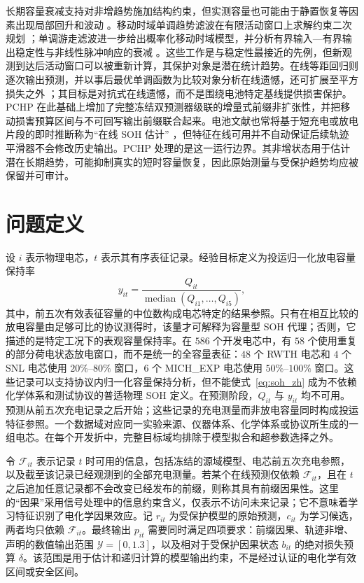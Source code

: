 \documentclass[UTF8,11pt]{ctexart}
\begin{document}
长期容量衰减支持对非增趋势施加结构约束，但实测容量也可能由于静置恢复等因素出现局部回升和波动 \citep{ma2021regeneration}。移动时域单调趋势滤波在有限活动窗口上求解约束二次规划 \mbox{\citep{samar2004moving}}；单调游走滤波进一步给出概率化移动时域模型，并分析有界输入—有界输出稳定性与非线性脉冲响应的衰减 \citep{gorinevsky2008efficient}。这些工作是与稳定性最接近的先例，但新观测到达后活动窗口可以被重新计算，其保护对象是潜在统计趋势。在线等距回归则逐次输出预测，并以事后最优单调函数为比较对象分析在线遗憾，还可扩展至平方损失之外 \citep{kotlowski2016online}；其目标是对抗式在线遗憾，而不是围绕电池特定基线提供损害保护。PCHP 在此基础上增加了完整冻结双预测器级联的增量式前缀非扩张性，并把移动损害预算区间与不可回写输出前缀联合起来。电池文献也常将基于短充电或放电片段的即时推断称为“在线 SOH 估计” \citep{liu2020online}，但特征在线可用并不自动保证后续轨迹平滑器不会修改历史输出。PCHP 处理的是这一运行边界。其非增状态用于估计潜在长期趋势，可能抑制真实的短时容量恢复，因此原始测量与受保护趋势均应被保留并可审计。

\section{问题定义}

设 $i$ 表示物理电芯，$t$ 表示其有序表征记录。经验目标定义为投运归一化放电容量保持率
\begin{equation}
  y_{it}=\frac{Q_{it}}{\operatorname{median}(Q_{i1},\ldots,Q_{i5})},
  \label{eq:soh_zh}
\end{equation}
其中，前五次有效表征容量的中位数构成电芯特定的结果参照。只有在相互比较的放电容量由足够可比的协议测得时，该量才可解释为容量型 SOH 代理；否则，它描述的是特定工况下的表观容量保持率。在 $586$ 个开发电芯中，有 $58$ 个使用重复的部分荷电状态放电窗口，而不是统一的全容量表征：$48$ 个 RWTH 电芯和 $4$ 个 SNL 电芯使用 $20\%$--$80\%$ 窗口，$6$ 个 MICH\_EXP 电芯使用 $50\%$--$100\%$ 窗口。这些记录可以支持协议内归一化容量保持分析，但不能使式~\eqref{eq:soh_zh} 成为不依赖化学体系和测试协议的普适物理 SOH 定义。在预测阶段，$Q_{it}$ 与 $y_{it}$ 均不可用。预测从前五次充电记录之后开始；这些记录的充电测量而非放电容量同时构成投运特征参照。一个数据域对应同一实验来源、仪器体系、化学体系或协议所生成的一组电芯。在每个开发折中，完整目标域均排除于模型拟合和超参数选择之外。

令 $\mathcal F_{it}$ 表示记录 $t$ 时可用的信息，包括冻结的源域模型、电芯前五次充电参照，以及截至该记录已经观测到的全部充电测量。若某个在线预测仅依赖 $\mathcal F_{it}$，且在 $t$ 之后追加任意记录都不会改变已经发布的前缀，则称其具有前缀因果性。这里的“因果”采用信号处理中的信息约束含义，仅表示不访问未来记录；它不意味着学习特征识别了电化学因果效应。记 $r_{it}$ 为受保护模型的原始预测，$c_{it}$ 为学习候选，两者均只依赖 $\mathcal F_{it}$。最终输出 $p_{it}$ 需要同时满足四项要求：前缀因果、轨迹非增、声明的数值输出范围 $\mathcal Y=[0,1.3]$，以及相对于受保护因果状态 $b_{it}$ 的绝对损失预算 $\delta$。该范围是用于估计和递归计算的模型输出约束，不是经过认证的电化学有效区间或安全区间。
\end{document}
